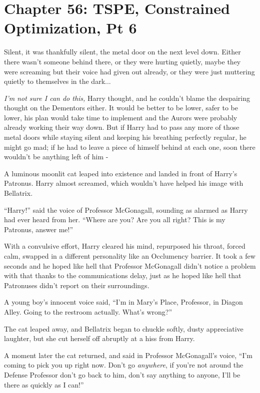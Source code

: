 \chapter{Chapter 56: TSPE, Constrained Optimization, Pt 6}
Silent, it was thankfully silent, the metal door on the next level down. Either there wasn't someone behind there, or they were hurting quietly, maybe they were screaming but their voice had given out already, or they were just muttering quietly to themselves in the dark...

\emph{I'm not sure I can do this,} Harry thought, and he couldn't blame the despairing thought on the Dementors either. It would be better to be lower, safer to be lower, his plan would take time to implement and the Aurors were probably already working their way down. But if Harry had to pass any more of those metal doors while staying silent and keeping his breathing perfectly regular, he might go mad; if he had to leave a piece of himself behind at each one, soon there wouldn't be anything left of him -

A luminous moonlit cat leaped into existence and landed in front of Harry's Patronus. Harry almost screamed, which wouldn't have helped his image with Bellatrix.

``Harry!'' said the voice of Professor McGonagall, sounding as alarmed as Harry had ever heard from her. ``Where are you? Are you all right? This is my Patronus, answer me!''

With a convulsive effort, Harry cleared his mind, repurposed his throat, forced calm, swapped in a different personality like an Occlumency barrier. It took a few seconds and he hoped like hell that Professor McGonagall didn't notice a problem with that thanks to the communications delay, just as he hoped like hell that Patronuses didn't report on their surroundings.

A young boy's innocent voice said, ``I'm in Mary's Place, Professor, in Diagon Alley. Going to the restroom actually. What's wrong?''

The cat leaped away, and Bellatrix began to chuckle softly, dusty appreciative laughter, but she cut herself off abruptly at a hiss from Harry.

A moment later the cat returned, and said in Professor McGonagall's voice, ``I'm coming to pick you up right now. Don't go \emph{anywhere}, if you're not around the Defense Professor don't go back to him, don't say anything to anyone, I'll be there as quickly as I can!''

